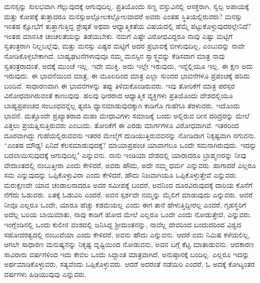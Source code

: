 ಮನಸ್ಸನ್ನು ಸುಲಭವಾಗಿ ಗೆಲ್ಲುವುದಕ್ಕೆ ಆಗುವುದಿಲ್ಲ. ಪ್ರತಿಯೊಂದು ಸಣ್ಣ ವಸ್ತುವಿನಲ್ಲಿ ಆಸಕ್ತರಾಗಿ, ಸ್ವಲ್ಪ ಅಪಾಯಕ್ಕೆ ಮತ್ತು ಕೋಪಕ್ಕೆ ತುತ್ತಾದರೂ ಮನಸ್ಸು\break ಅಲ್ಲೋಲಕಲ್ಲೋಲವಾದರೆ ಅವರು ಎಂತಹ ಸ್ಥಿತಿಯಲ್ಲಿರುವರು? ಮನಸ್ಸು ಇಂತಹ ಕ್ಷೋಭೆಗೆ ತುತ್ತಾಗುತ್ತಿದ್ದ ಶ್ರೇಷ್ಠತೆ ಅಥವಾ ಆಧ್ಯಾತ್ಮಿಕತೆಯ ವಿಷಯದಲ್ಲಿ ಹೆಮ್ಮೆ ಪಟ್ಟುಕೊಳ್ಳುವುದರಲ್ಲೇನಿದೆ? ಇಂತಹ ಮಾನಸಿಕ ಚಂಚಲತೆಯನ್ನು ತಡೆಯಬೇಕು. ನಮಗೆ ಎಷ್ಟೇ ವಿರೋಧವಿದ್ದರೂ ನಾವು ಎಷ್ಟು ಮಟ್ಟಿಗೆ ಸ್ವತಂತ್ರರಾಗಿ ನಿಲ್ಲಬಲ್ಲೆವು, ಮತ್ತು ಮನಸ್ಸು ಎಷ್ಟರ ಮಟ್ಟಿಗೆ ಅದರ ಪ್ರಭಾವಕ್ಕೆ ಬೀಳುವುದಿಲ್ಲ, ಎಂಬುದನ್ನು ನಾವೇ ನೋಡಿಕೊಳ್ಳಬೇಕಾಗಿದೆ. ಬಾಹ್ಯಘಟನೆಗಳಾವುವೂ ನಮ್ಮ ಮನಸ್ಸಿನ ಸ್ವಾಸ್ಥ್ಯವನ್ನು ಕೆಡಿಸದಾಗ ಮಾತ್ರ ನಾವು ಸ್ವತಂತ್ರರಾದಂತೆ, ಅದಕ್ಕೆ ಮುಂಚೆ ಇಲ್ಲ. ಇದೇ ಮುಕ್ತಿ. ಅದು ಇಲ್ಲೇ ಇರುವುದು, ಇನ್ನೆಲ್ಲಿಯೂ ಇಲ್ಲ. ಈ ಕ್ಷಣ ಅದು ಇರುವುದು. ಈ ಭಾವನೆಯಿಂದ ಮಾತ್ರ, ಈ ಮೂಲದಿಂದ ಮಾತ್ರ ಎಲ್ಲಾ ಸುಂದರ ಭಾವನೆಗಳೂ ಪ್ರಪಂಚಕ್ಕೆ ಹರಿದು ಬಂದಿವೆ. ಸಾಧಾರಣವಾಗಿ ಈ ಭಾವನೆಗಳನ್ನು ತಪ್ಪು ತಿಳಿದುಕೊಂಡಿರುವರು. ಇವು ತೋರಿಕೆಗೆ ಮಾತ್ರ ಪರಸ್ಪರ ವಿರೋಧವಾಗಿರುವಂತೆ ಕಾಣುವುವು. ಹಲವು ಧೀರರಾದ ಆಧ್ಯಾತ್ಮಿಕ ವ್ಯಕ್ತಿಗಳು ಪ್ರತಿಯೊಂದು ದೇಶದಲ್ಲಿಯೂ ಬಾಹ್ಯಪ್ರಪಂಚದ ಸಂಬಂಧವನ್ನೆಲ್ಲ ತ್ಯಜಿಸಿ ಧ್ಯಾನಮಾಡುವುದಕ್ಕಾಗಿ ಕಾಡಿಗೊ ಗುಹೆಗೂ ತೆರಳುವರು. ಇದೊಂದು ಭಾವನೆ. ಮತ್ತೊಂದೇ ಪ್ರಖ್ಯಾತರಾದ ಮಹಾ ಮೇಧಾವಿಗಳು ಸಮಾಜಕ್ಕೆ ಬಂದು ಅಲ್ಲಿರುವ ದೀನ ದರಿದ್ರರನ್ನು ಮೇಲೆ ಎತ್ತಲು ಪ್ರಯತ್ನಿಸುತ್ತಿರುವರು ಎಂಬುದು. ತೋರಿಕೆಗೆ ಈ ಎರಡು ಮಾರ್ಗಗಳೂ ವಿರೋಧವಾಗಿವೆ. ಇತರರಿಂದ ದೂರವಾಗಿದ್ದು ಗುಹೆಯಲ್ಲಿರುವವನು ಇತರರ ಮೇಲ್ಮೆಗೆ ದುಡಿಯುತ್ತಿರುವವನನ್ನು ನೋಡಿದಾಗ ನಿಕೃಷ್ಟವಾಗಿ ನಗುವನು. “ಎಂತಹ ಮೌಢ್ಯ! ಏನಿದೆ ಕೆಲಸಮಾಡುವುದಕ್ಕೆ? ಮಾಯಾಪ್ರಪಂಚ ಯಾವಾಗಲೂ ಒಂದೇ ಸಮನಾಗಿರುವುದು. ಇದನ್ನು ಬದಲಾಯಿಸುವುದಕ್ಕೆ ಆಗುವುದಿಲ್ಲ" ಎನ್ನುವನು. ನಾನು ಇಂಡಿಯಾ ದೇಶದಲ್ಲಿ ಯಾರಾದರೂ ಬ್ರಾಹ್ಮಣರನ್ನು ನೀವು ವೇದಾಂತದಲ್ಲಿ ನಂಬುತ್ತೀರಾ ಎಂದು ಕೇಳಿದರೆ, ಅವರು ಹೌದು, ಅದೇ ನಮ್ಮ ಧರ್ಮ ಎನ್ನುವರು. ಹಾಗಾದರೆ ಎಲ್ಲರೂ ಸಮ ಎನ್ನುವುದನ್ನು ಒಪ್ಪಿಕೊಳ್ಳುವಿರಾ ಎಂದು ಕೇಳಿದರೆ, ಹೌದು ನಿಜವಾಗಿಯೂ ಒಪ್ಪಿಕೊಳ್ಳುತ್ತೇವೆ ಎನ್ನುವರು. ಮರುಕ್ಷಣವೇ ಯಾವ ಚಂಡಾಲನಾದರೂ ಅವರ ಸಮೀಪಕ್ಕೆ ಬಂದರೆ, ಅವನಿಂದ ದೂರವಿರುವುದಕ್ಕೆ ದಾರಿಯ ಕೊನೆಗೆ ನೆಗೆದು ಓಡುವರು. ಏತಕ್ಕೆ ಓಡುವಿರಿ ಎಂದರೆ, ಅವನ ಸ್ಪರ್ಶವೇ ನಮ್ಮನ್ನು ಮೈಲಿಗೆ ಮಾಡುವುದು ಎನ್ನುವರು. ಆದರೆ ನೀವೂ ಎಲ್ಲರೂ ಒಂದೇ, ಯಾರೂ ಹೆಚ್ಚು ಕಡಮೆಯಲ್ಲ ಎಂದು ಈಗ ತಾನೆ ಹೇಳುತ್ತಿದ್ದೀರಲ್ಲ ಎಂದರೆ, ಗೃಹಸ್ಥರಿಗೆ ಅದೆಲ್ಲ ಬರಿಯ ಬಾಯಿಮಾತು, ನಾವು ಕಾಡಿಗೆ ಹೋದ ಮೇಲೆ ಎಲ್ಲರೂ ಒಂದೇ ಎಂದು ನೋಡುತ್ತೇವೆ, ಎನ್ನುವರು. ಇಂಗ್ಲೆಂಡಿನಲ್ಲಿ ಒಂದು ಕುಲೀನ ವಂಶದಲ್ಲಿ ಜನಿಸಿದ್ದ ಶ‍್ರೀಮಂತನನ್ನು, ನಾವೆಲ್ಲ ದೇವರಿಂದ ಬಂದುದರಿಂದ ವಿಶ್ವದ ಸಹೋದರತ್ವದಲ್ಲಿ ನಂಬುವೆಯಾ ಎಂದು ಕೇಳಿದರೆ, ಅವನು ಹೌದು ಎನ್ನುವನು. ಆದರೆ ಐದು ನಿಮಿಷ ಕಳೆಯಲಿಲ್ಲ, ಆಗಲೇ ಸಾಧಾರಣ ಮನುಷ್ಯನನ್ನು ನಿಕೃಷ್ಟ ದೃಷ್ಟಿಯಿಂದ ನೋಡುವನು, ಅವನ ಬಗ್ಗೆ ಕೆಟ್ಟ ಮಾತಾಡುವನು. ಆದಕಾರಣ ಸಾವಿರಾರು ವರ್ಷಗಳಿಂದ ಇದು ಕೇವಲ ಒಂದು ಸಿದ್ದಾಂತ ಮಾತ್ರವಾಗಿದೆ, ಅನುಷ್ಠಾನಕ್ಕೆ ಬಂದಿಲ್ಲ. ಎಲ್ಲರೂ ಇದನ್ನು ಅರ್ಥಮಾಡಿಕೊಳ್ಳುವರು, ಸತ್ಯವೆಂದು ಒಪ್ಪಿಕೊಳ್ಳುವರು. ಆದರೆ ಅದರಂತೆ ನಡೆಯಿರಿ ಎಂದರೆ, ಓ ಅದಕ್ಕೆ ಕೋಟ್ಯಂತರ ವರ್ಷಗಳು ಹಿಡಿಯುವುವು ಎನ್ನುವರು.

